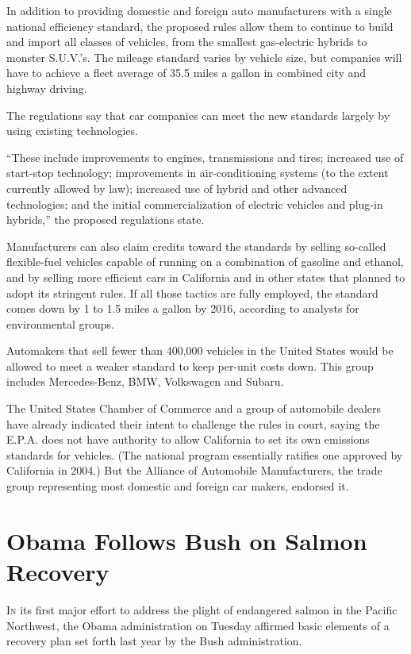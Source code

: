 ﻿\documentclass[12pt]{article}
\begin{document}
In addition to providing domestic and foreign auto manufacturers with a single national efficiency
standard, the proposed rules allow them to continue to build and import all classes of vehicles,
from the smallest gas-electric hybrids to monster S.U.V.'s. The mileage standard varies by vehicle
size, but companies will have to achieve a fleet average of 35.5 miles a gallon in combined city and
highway driving.

The regulations say that car companies can meet the new standards largely by using existing
technologies.

``These include improvements to engines, transmissions and tires; increased use of start-stop
technology; improvements in air-conditioning systems (to the extent currently allowed by law);
increased use of hybrid and other advanced technologies; and the initial commercialization of
electric vehicles and plug-in hybrids,'' the proposed regulations state.

Manufacturers can also claim credits toward the standards by selling so-called flexible-fuel
vehicles capable of running on a combination of gasoline and ethanol, and by selling more efficient
cars in California and in other states that planned to adopt its stringent rules. If all those
tactics are fully employed, the standard comes down by 1 to 1.5 miles a gallon by 2016, according to
analysts for environmental groups.

Automakers that sell fewer than 400,000 vehicles in the United States would be allowed to meet a
weaker standard to keep per-unit costs down. This group includes Mercedes-Benz, BMW, Volkswagen and
Subaru.

The United States Chamber of Commerce and a group of automobile dealers have already indicated their
intent to challenge the rules in court, saying the E.P.A. does not have authority to allow
California to set its own emissions standards for vehicles. (The national program essentially
ratifies one approved by California in 2004.) But the Alliance of Automobile Manufacturers, the
trade group representing most domestic and foreign car makers, endorsed it.

\section{Obama Follows Bush on Salmon\cite{salmon} Recovery}

\lettrine{I}{n} its first major effort to address the plight of endangered salmon in the Pacific
Northwest, the Obama administration on Tuesday affirmed basic elements of a recovery plan set forth
last year by the Bush administration.
\end{document}
